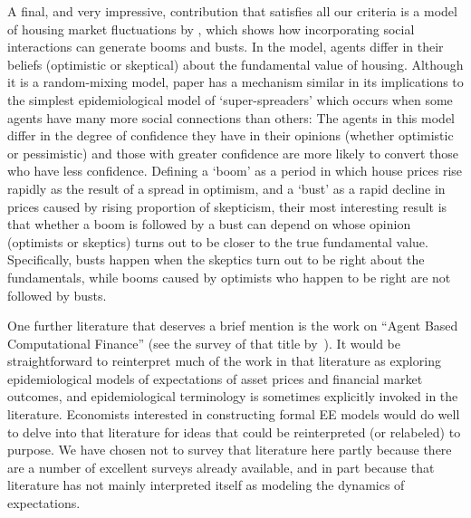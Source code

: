 A final, and very impressive, contribution that satisfies all our criteria is a model of housing market fluctuations by \href{https://www.journals.uchicago.edu/doi/abs/10.1086/686732}{\cite{burnside_understanding_2016}}, which shows how incorporating social interactions can generate booms and busts. In the model, agents differ in their beliefs (optimistic or skeptical) about the fundamental value of housing.  Although it is a random-mixing model, paper has a mechanism similar in its implications to the simplest epidemiological model of `super-spreaders' which occurs when some agents have many more social connections than others:  The agents in this model differ in the degree of confidence they have in their opinions (whether optimistic or pessimistic) and those with greater confidence are more likely to convert those who have less confidence.  Defining a `boom' as a period in which house prices rise rapidly as the result of a spread in optimism, and a `bust' as a rapid decline in prices caused by rising proportion of skepticism, their most interesting result is that whether a boom is followed by a bust can depend on whose opinion (optimists or skeptics) turns out to be closer to the true fundamental value.  Specifically, busts happen when the skeptics turn out to be right about the fundamentals, while booms caused by optimists who happen to be right are not followed by busts.

One further literature that deserves a brief mention is the work on ``Agent Based Computational Finance'' (see the survey of that title by~\cite{lebaronAgentCompFinance}).  It would be straightforward to reinterpret much of the work in that literature as exploring epidemiological models of expectations of asset prices and financial market outcomes, and epidemiological terminology is sometimes explicitly invoked in the literature.  Economists interested in constructing formal EE models would do well to delve into that literature for ideas that could be reinterpreted (or relabeled) to purpose.  We have chosen not to survey that literature here partly because there are a number of excellent surveys already available, and in part because that literature has not mainly interpreted itself as modeling the dynamics of expectations.